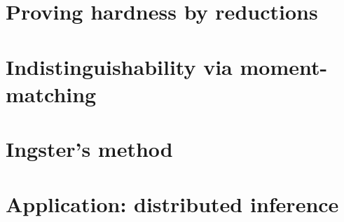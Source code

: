 \documentclass[biber]{nowfnt} %
\begin{document}
\section{Proving hardness by reductions}
\section{Indistinguishability via moment-matching}
\section{Ingster's method}
\section{Application: distributed inference}

%
%
%
%
\end{document}
